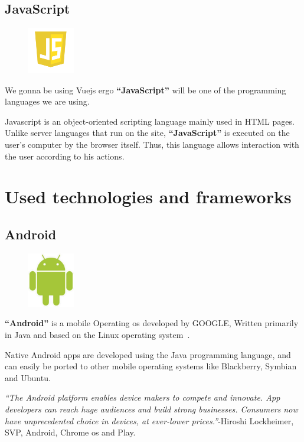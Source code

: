 \documentclass[12pt,a4paper]{report}
\begin{document}
	\subsection{JavaScript}
	\begin{figure}
		\centering
		\includegraphics[width=0.8in]{JavaScript-logo.png}	
	\end{figure}
	We gonna be using Vuejs ergo \textbf{``JavaScript''} will be one of the programming languages we are using.\par 
	Javascript is an object-oriented scripting language mainly used in HTML pages. Unlike server languages that run on the site, \textbf{``JavaScript''} is executed on the user's computer by the browser itself. Thus, this language allows interaction with the user according to his actions.
	\section{Used technologies and frameworks}
	
	\subsection{Android}
	\begin{figure}
		\centering
		\includegraphics[width=0.8in]{android-logo.jpg}	
	\end{figure}
	\textbf{``Android''} is a mobile Operating \ac{os} developed by GOOGLE, Written primarily in Java and based on the Linux operating system~\cite{phillips2013android}.\par
	Native Android apps are developed using the Java programming language, and can easily be ported to other mobile operating systems like Blackberry, Symbian and Ubuntu.\par
	\textit{``The Android platform enables device makers to compete and innovate. App developers can reach huge audiences and build strong businesses. Consumers now have unprecedented choice in devices, at ever-lower prices.''}-Hiroshi Lockheimer, SVP, Android, Chrome \ac{os} and Play.
\end{document}
